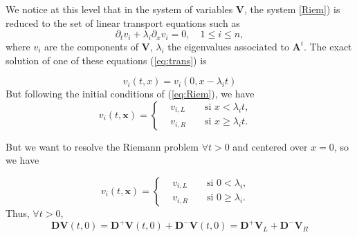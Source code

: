 \documentclass[a4paper,oneside,10pt]{report}
\begin{document}
We notice at this level that in the system of variables $\mathbf{V}$, the system \ref{Riem}) is reduced to the set of linear transport equations  such as
\begin{equation}
\label{eq:trans}
\partial_t v_i + \lambda_i \partial_x v_i = 0, \quad 1\leq i \leq n,
\end{equation}
where $v_i$ are the components of $\mathbf{V}$, $\lambda_i$ the eigenvalues associated to $\mathbf{A}^i$. The exact solution of one of these equations (\ref{eq:trans}) is

\begin{equation}
v_i(t,x) = v_i(0, x-\lambda_it)
\end{equation} 
But following the initial conditions of (\ref{eq:Riem}), we have
\begin{equation}
v_i(t,\mathbf{x}) = \left\{
\begin{aligned}
&v_{i,L}& &\mbox{ si } x < \lambda_it,&\\
&v_{i,R}& &\mbox{ si } x \geq \lambda_it.&
\end{aligned}
\right.
\end{equation}


But we want to resolve the Riemann problem $\forall t > 0$ and centered over $x=0$, so we have

\begin{equation}
v_i(t,\mathbf{x}) = \left\{
\begin{aligned}
&v_{i,L}& &\mbox{ si }  0 <\lambda_i,&\\
&v_{i,R}& &\mbox{ si } 0 \geq \lambda_i .&
\end{aligned}
\right.
\end{equation}
Thus, $\forall t > 0$,
\begin{equation}
\mathbf{D} \mathbf{V}(t,0) = \mathbf{D}^+\mathbf{V}(t,0) + \mathbf{D}^-\mathbf{V}(t,0)  =  \mathbf{D}^+\mathbf{V}_L  + \mathbf{D}^-\mathbf{V}_R 
\end{equation}
 
\end{document}
